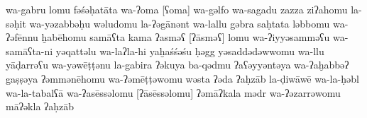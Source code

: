 \begin{transliteration}
    wa-gabru
    lomu fəśəḥatāta wa-ʔoma [ʕoma] wa-gəlfo wa-sagadu zazza ziʔahomu
    la-səḥit wa-yəzabbəḥu wəludomu la-ʔəgānənt wa-lallu gəbra
    saḥtata ləbbomu
    wa-ʔəfēnnu ḫabēhomu samāʕta kama
    ʔasməʕ [ʔāsməʕ] lomu wa-ʔiyyəsamməʕu  wa-samāʕta-ni yəqattəlu wa-laʔla-hi
    yaḫaśśəśu ḥəgg yəsaddədəwwomu wa-llu yāḍarrəʕu wa-yəwēṭṭənu la-gabira
    ʔəkuya ba-qədmu ʔaʕəyyəntəya
    wa-ʔaḫabbəʔ gaṣṣəya
    ʔəmmənēhomu wa-ʔəmēṭṭəwomu wəsta ʔəda ʔaḥzāb la-ḍiwāwē
    wa-la-ḥəbl wa-la-tabalʕā wa-ʔasēssəlomu [ʔāsēssəlomu] ʔəmāʔkala mədr
    wa-ʔəzarrəwomu māʔəkla ʔaḥzāb

\end{transliteration}
